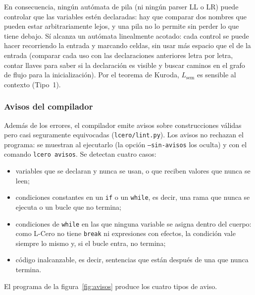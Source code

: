 \documentclass[11pt,a4paper]{article}
\theoremstyle{definition}
\newcommand{\tm}[1]{\texttt{#1}}
\renewcommand{\paragraph}[1]{\subsubsection*{#1}}
\begin{document}
En consecuencia, ningún autómata de pila (ni ningún parser LL o LR) puede
controlar que las variables estén declaradas: hay que comparar dos nombres
que pueden estar arbitrariamente lejos, y una pila no lo permite sin perder
lo que tiene debajo. Sí alcanza un autómata linealmente acotado: cada
control se puede hacer recorriendo la entrada y marcando celdas, sin usar
más espacio que el de la entrada (comparar cada uso con las declaraciones
anteriores letra por letra, contar llaves para saber si la declaración es
visible y buscar caminos en el grafo de flujo para la inicialización). Por
el teorema de Kuroda, $L_{\mathrm{sem}}$ es sensible al contexto (Tipo~1).

\paragraph{Avisos del compilador}

Además de los errores, el compilador emite avisos sobre construcciones
válidas pero casi seguramente equivocadas (\tm{lcero/lint.py}). Los avisos
no rechazan el programa: se muestran al ejecutarlo (la opción
\tm{--sin-avisos} los oculta) y con el comando \tm{lcero avisos}. Se
detectan cuatro casos:

\begin{itemize}
  \item variables que se declaran y nunca se usan, o que reciben valores que
  nunca se leen;
  \item condiciones constantes en un \tm{if} o un \tm{while}, es decir, una
  rama que nunca se ejecuta o un bucle que no termina;
  \item condiciones de \tm{while} en las que ninguna variable se asigna dentro
  del cuerpo: como L-Cero no tiene \tm{break} ni expresiones con efectos, la
  condición vale siempre lo mismo y, si el bucle entra, no termina;
  \item código inalcanzable, es decir, sentencias que están después de una que
  nunca termina.
\end{itemize}

El programa de la figura~\ref{fig:avisos} produce los cuatro tipos de aviso.
\end{document}
